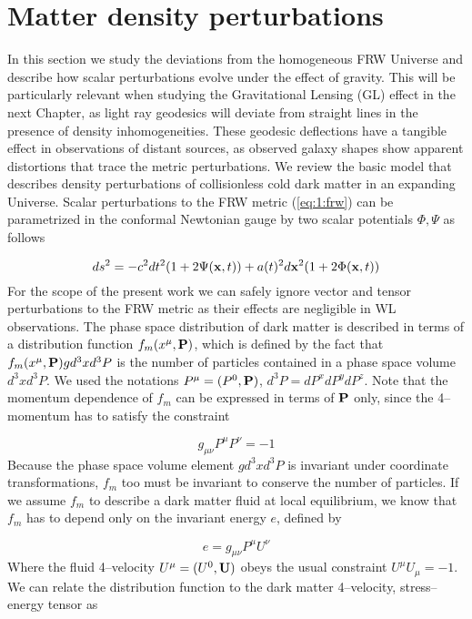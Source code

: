 \section{Matter density perturbations}
In this section we study the deviations from the homogeneous FRW Universe and describe how scalar perturbations evolve under the effect of gravity. This will be particularly relevant when studying the Gravitational Lensing (GL) effect in the next Chapter, as light ray geodesics will deviate from straight lines in the presence of density inhomogeneities. These geodesic deflections have a tangible effect in observations of distant sources, as observed galaxy shapes show apparent distortions that trace the metric perturbations. We review the basic model that describes density perturbations of collisionless cold dark matter in an expanding Universe. Scalar perturbations to the FRW metric (\ref{eq:1:frw}) can be parametrized in the conformal Newtonian gauge \citep{Dodelson-C4} by two scalar potentials $\Phi,\Psi$ as follows

\begin{equation}
\label{eq:1:confnewt}
ds^2 = -c^2dt^2(1+2\Psi(\mathbf{x},t)) + a(t)^2d\mathbf{x}^2(1+2\Phi(\mathbf{x},t))
\end{equation}
%
For the scope of the present work we can safely ignore vector and tensor perturbations to the FRW metric as their effects are negligible in WL observations. The phase space distribution of dark matter is described in terms of a distribution function $f_m(x^\mu,\mathbf{P})$, which is defined by the fact that $f_m(x^\mu,\mathbf{P})g d^3x d^3P$ is the number of particles contained in a phase space volume $d^3x d^3P$. We used the notations $P^\mu=(P^0,\mathbf{P})$, $d^3 P = dP^x dP^y dP^z$. Note that the momentum dependence of $f_m$ can be expressed in terms of $\mathbf{P}$ only, since the 4--momentum has to satisfy the constraint

\begin{equation}
\label{eq:1:m-constraint}
g_{\mu\nu}P^\mu P^\nu = -1
\end{equation} 
%
Because the phase space volume element $g d^3x d^3P$ is invariant under coordinate transformations, $f_m$ too must be invariant to conserve the number of particles. If we assume $f_m$ to describe a dark matter fluid at local equilibrium, we know that $f_m$ has to depend only on the invariant energy $e$, defined by \citep{JuttnerCov}

\begin{equation}
\label{eq:1:invariant-e}
e = g_{\mu\nu}P^\mu U^\nu
\end{equation}
%
Where the fluid 4--velocity $U^\mu = (U^0,\mathbf{U})$ obeys the usual constraint $U^\mu U_\mu=-1$. We can relate the distribution function to the dark matter 4--velocity, stress--energy tensor \citep{JuttnerCov} as

